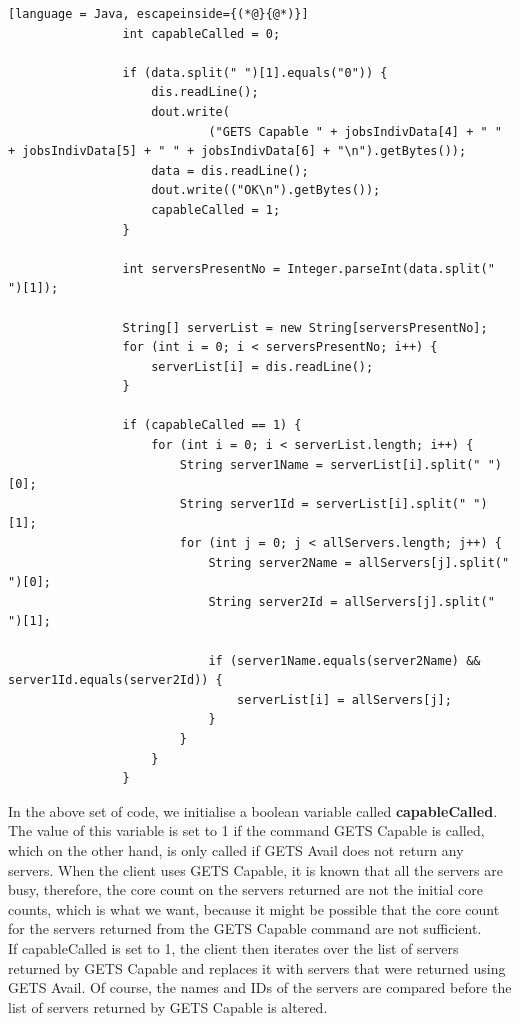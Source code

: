 \documentclass[a4paper]{article} %
\begin{document}
\begin{lstlisting}[language = Java, escapeinside={(*@}{@*)}]
				int capableCalled = 0;

				if (data.split(" ")[1].equals("0")) {
					dis.readLine();
					dout.write(
							("GETS Capable " + jobsIndivData[4] + " " + jobsIndivData[5] + " " + jobsIndivData[6] + "\n").getBytes());
					data = dis.readLine();
					dout.write(("OK\n").getBytes());
					capableCalled = 1;
				}

				int serversPresentNo = Integer.parseInt(data.split(" ")[1]);

				String[] serverList = new String[serversPresentNo];
				for (int i = 0; i < serversPresentNo; i++) {
					serverList[i] = dis.readLine();
				}

				if (capableCalled == 1) {
					for (int i = 0; i < serverList.length; i++) {
						String server1Name = serverList[i].split(" ")[0];
						String server1Id = serverList[i].split(" ")[1];
						for (int j = 0; j < allServers.length; j++) {
							String server2Name = allServers[j].split(" ")[0];
							String server2Id = allServers[j].split(" ")[1];

							if (server1Name.equals(server2Name) && server1Id.equals(server2Id)) {
								serverList[i] = allServers[j];
							}
						}
					}
				}

\end{lstlisting}
In the above set of code, we initialise a boolean variable called \textbf{capableCalled}. The value of this variable is 
set to 1 if the command GETS Capable is called, which on the other hand, is only called if GETS Avail does not return any servers. 
When the client uses GETS Capable, it is known that all the servers are busy, therefore, the core count on the servers returned 
are not the initial core counts, which is what we want, because it might be possible that the core count for the servers returned 
from the GETS Capable command are not sufficient.  \\ 

If capableCalled is set to 1, the client then iterates over the list of servers returned by GETS Capable and replaces it with 
servers that were returned using GETS Avail. Of course, the names and IDs of the servers are compared before the list of servers returned
by GETS Capable is altered. \\
\end{document}
